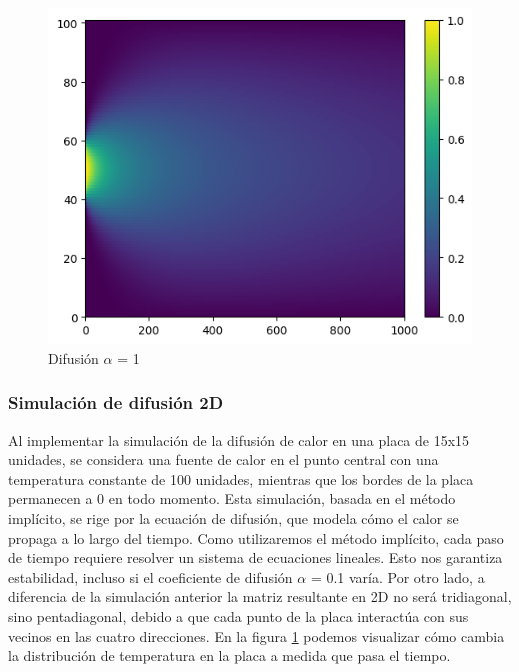 \begin{figure}[H]
  \begin{minipage}[b]{0.5\linewidth}
    \centering
    \includegraphics[width=.5\linewidth]{./img/result_dif.png}
  \caption{Difusión $\alpha$ = 1}\label{result_dif}
    \vspace{4ex}
  \end{minipage} 
\end{figure}








\subsubsection{Simulación de difusión 2D}

Al implementar la simulación de la difusión de calor en una placa de 15x15 unidades, se considera una fuente de calor en el punto central con una temperatura constante de 100 unidades, mientras que los bordes de la placa permanecen a 0 en todo momento. Esta simulación, basada en el método implícito, se rige por la ecuación de difusión, que modela cómo el calor se propaga a lo largo del tiempo.
 Como utilizaremos el método implícito, cada paso de tiempo requiere resolver un sistema de ecuaciones lineales. Esto nos garantiza estabilidad, incluso si el coeficiente de difusión $\alpha$ = 0.1 varía.
Por otro lado, a diferencia de la simulación anterior la matriz resultante en 2D no será tridiagonal, sino pentadiagonal, debido a que cada punto de la placa interactúa con sus vecinos en las cuatro direcciones.
En la figura \ref{result_dif} podemos visualizar cómo cambia la distribución de temperatura en la placa a medida que pasa el tiempo.

